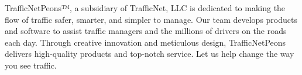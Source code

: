 TrafficNetPeons™, a subsidiary of TrafficNet, LLC is dedicated to making the flow of traffic safer, smarter, and simpler to manage. Our team develops products and software to assist traffic managers and the millions of drivers on the roads each day. Through creative innovation and meticulous design, TrafficNetPeons delivers high-quality products and top-notch service. Let us help change the way you see traffic.
